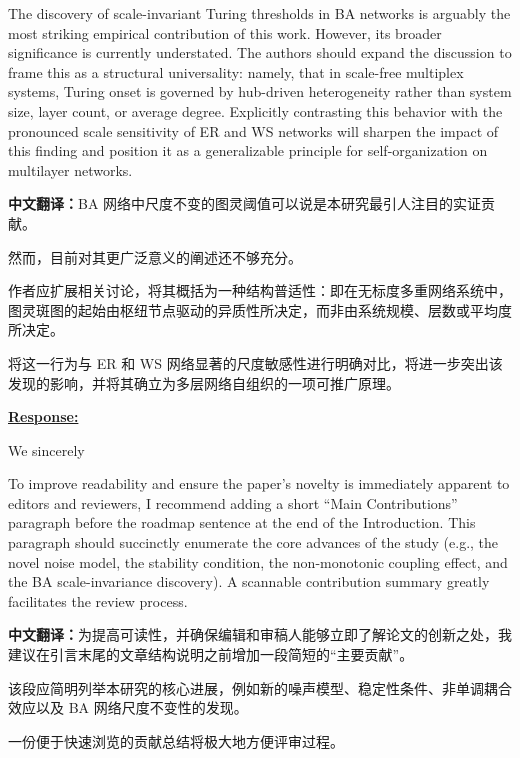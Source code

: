 \documentclass[a4paper,12pt]{article}
\newcommand{\zhtranslationfirst}[1]{%
    \par\medskip\noindent
    {\small\color{blue!60!black}\textbf{中文翻译：}#1}\par
}
\newcommand{\zhtranslation}[1]{%
    \par\smallskip\noindent
    {\small\color{blue!60!black}#1}\par
}
\begin{document}
\newpage
\begin{tcolorbox}[title = {Comment 3},fonttitle = \bfseries]
    The discovery of scale-invariant Turing thresholds in BA networks is arguably the most striking empirical contribution of this work. However, its broader significance is currently understated. The authors should expand the discussion to frame this as a structural universality: namely, that in scale-free multiplex systems, Turing onset is governed by hub-driven heterogeneity rather than system size, layer count, or average degree. Explicitly contrasting this behavior with the pronounced scale sensitivity of ER and WS networks will sharpen the impact of this finding and position it as a generalizable principle for self-organization on multilayer networks.
    \zhtranslationfirst{BA 网络中尺度不变的图灵阈值可以说是本研究最引人注目的实证贡献。}
    \zhtranslation{然而，目前对其更广泛意义的阐述还不够充分。}
    \zhtranslation{作者应扩展相关讨论，将其概括为一种结构普适性：即在无标度多重网络系统中，图灵斑图的起始由枢纽节点驱动的异质性所决定，而非由系统规模、层数或平均度所决定。}
    \zhtranslation{将这一行为与 ER 和 WS 网络显著的尺度敏感性进行明确对比，将进一步突出该发现的影响，并将其确立为多层网络自组织的一项可推广原理。}
\end{tcolorbox}

\noindent \underline {\textbf{Response:}}
\bigskip

We sincerely


\newpage
\begin{tcolorbox}[title = {Comment 4},fonttitle = \bfseries]
    To improve readability and ensure the paper’s novelty is immediately apparent to editors and reviewers, I recommend adding a short “Main Contributions” paragraph before the roadmap sentence at the end of the Introduction. This paragraph should succinctly enumerate the core advances of the study (e.g., the novel noise model, the stability condition, the non-monotonic coupling effect, and the BA scale-invariance discovery). A scannable contribution summary greatly facilitates the review process.
    \zhtranslationfirst{为提高可读性，并确保编辑和审稿人能够立即了解论文的创新之处，我建议在引言末尾的文章结构说明之前增加一段简短的“主要贡献”。}
    \zhtranslation{该段应简明列举本研究的核心进展，例如新的噪声模型、稳定性条件、非单调耦合效应以及 BA 网络尺度不变性的发现。}
    \zhtranslation{一份便于快速浏览的贡献总结将极大地方便评审过程。}
\end{tcolorbox}
\end{document}

